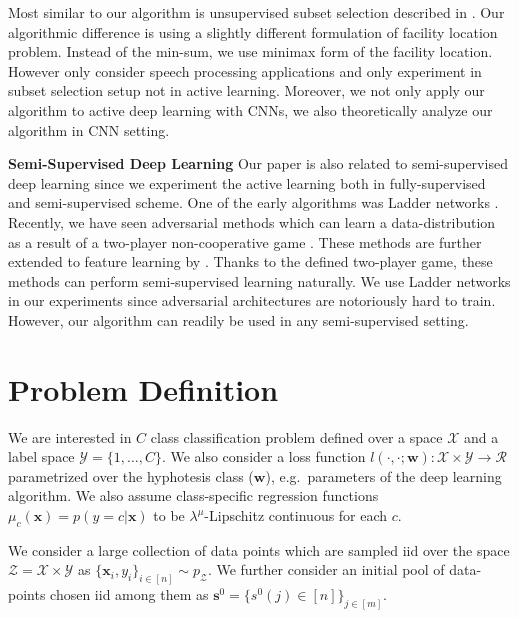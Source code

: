 \documentclass{article}
\begin{document}
Most similar to our algorithm is unsupervised subset selection described in \cite{wei2013using}. Our algorithmic difference is using a slightly different formulation of facility location problem. Instead of the min-sum, we use minimax \cite{facility} form of the facility location. However \cite{wei2013using} only consider speech processing applications and only experiment in subset selection setup not in active learning. Moreover, we not only apply our algorithm to active deep learning with CNNs, we also theoretically analyze our algorithm in CNN setting.
 
\noindent\textbf{Semi-Supervised Deep Learning}
Our paper is also related to semi-supervised deep learning since we experiment the active learning both in fully-supervised and semi-supervised scheme. 
One of the early algorithms was Ladder networks  \cite{ladder}. Recently, we have seen adversarial methods which can learn a data-distribution as a result of a two-player non-cooperative game \cite{salimans2016improved,gan_original,dcgan}. These methods are further extended to feature learning by \cite{ali, bigan}. Thanks to the defined two-player game, these methods can perform semi-supervised learning naturally. We use Ladder networks in our experiments since adversarial architectures are notoriously hard to train. However, our algorithm can readily be used in any semi-supervised setting.



\section{Problem Definition}
We are interested in $C$ class classification problem defined over a space $\mathcal{X}$ and a label space  $\mathcal{Y}=\{1,\ldots,C\}$. We also consider a loss function $l(\cdot,\cdot;\mathbf{w}):\mathcal{X}\times \mathcal{Y} \rightarrow \mathcal{R}$ parametrized over the hyphotesis class ($\mathbf{w}$), e.g.\ parameters of the deep learning algorithm. We also assume class-specific regression functions $\mu_c(\mathbf{x})=p(y=c|\mathbf{x})$ to be \mbox{$\lambda^\mu$-Lipschitz} continuous for each $c$.

We consider a large collection of data points which are sampled iid over the space  $\mathcal{Z}=\mathcal{X}\times\mathcal{Y}$ as \mbox{$\{\mathbf{x}_i,y_i\}_{i \in [n]} \sim p_\mathcal{Z}$}. We further consider an initial pool of data-points chosen iid among them as \mbox{$\mathbf{s}^0=\{s^0(j) \in [n]\}_{j \in [m]}$}. 
\end{document}
